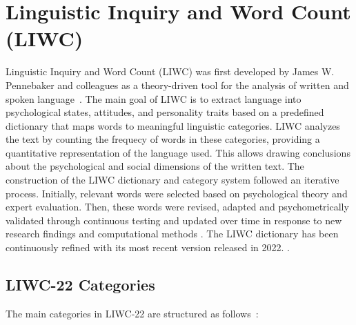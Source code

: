 \section{Linguistic Inquiry and Word Count (LIWC)}
Linguistic Inquiry and Word Count (LIWC) was first developed by James W. Pennebaker and colleagues as a theory-driven tool for the analysis of written and spoken language~\cite{tausczik2010psychological}. 
The main goal of LIWC is to extract language into psychological states, attitudes, and personality traits based on a predefined dictionary that maps words to meaningful linguistic categories. LIWC analyzes the text by counting the frequecy of words in these categories, providing a quantitative representation of the language used. This allows drawing conclusions about the psychological and social dimensions of the written text.
The construction of the LIWC dictionary and category system followed an iterative process. Initially, relevant words were selected based on psychological theory and expert evaluation. Then, these words were revised, adapted and psychometrically validated through continuous testing and updated over time in response to new research findings and computational methods \cite{tausczik2010psychological}. The LIWC dictionary has been continuously refined with its most recent version released in 2022. \parencite{pennebaker2022liwc}.


\subsection{LIWC-22 Categories}
The main categories in LIWC-22 are structured as follows~\cite{pennebaker2022liwc}:

